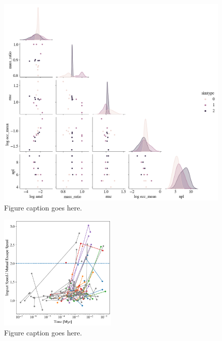 \begin{figure}
\begin{center}
    \includegraphics[width=\textwidth]{figures/stip/corner_full_syn_iso.png}
    \caption{Figure caption goes here.\label{fig:corner_full_syn_iso}}
\end{center}
\end{figure}

\begin{figure}
\begin{center}
    \includegraphics[width=0.5\textwidth]{figures/stip/impact_syn_comp.png}
    \caption{Figure caption goes here.\label{fig:impact_syn_comp}}
\end{center}
\end{figure}

